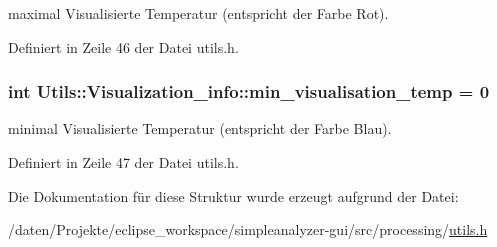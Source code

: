 maximal Visualisierte Temperatur (entspricht der Farbe Rot). 



Definiert in Zeile 46 der Datei utils.\-h.

\hypertarget{structUtils_1_1Visualization__info_a6e192352d1f00709f8ef963206ff2653}{
\subsubsection[{min\-\_\-visualisation\-\_\-temp}]{\setlength{\rightskip}{0pt plus 5cm}int Utils\-::\-Visualization\-\_\-info\-::min\-\_\-visualisation\-\_\-temp = 0}}\label{structUtils_1_1Visualization__info_a6e192352d1f00709f8ef963206ff2653}


minimal Visualisierte Temperatur (entspricht der Farbe Blau). 



Definiert in Zeile 47 der Datei utils.\-h.



Die Dokumentation für diese Struktur wurde erzeugt aufgrund der Datei\-:\begin{DoxyCompactItemize}
\item 
/daten/\-Projekte/eclipse\-\_\-workspace/simpleanalyzer-\/gui/src/processing/\hyperlink{utils_8h}{utils.\-h}\end{DoxyCompactItemize}
